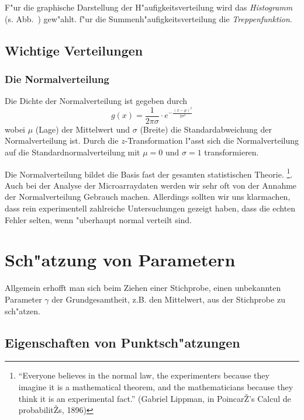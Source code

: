 F"ur die graphische Darstellung der H"aufigkeitsverteilung wird das {\em Histogramm} (s. Abb.~) gew"ahlt. f"ur die Summenh"aufigkeitsverteilung die {\em Treppenfunktion}.

%
\subsection{Wichtige Verteilungen}

\subsubsection{Die Normalverteilung}
Die Dichte der Normalverteilung ist gegeben durch
\begin{equation}\label{dichtenormal}
g(x) = \frac{1}{2\pi\sigma}\cdot e^{-\frac{(x-\mu)^2}{2\sigma^2}}
\end{equation}
wobei $\mu$ (Lage) der Mittelwert und $\sigma$ (Breite) die Standardabweichung der Normalverteilung ist. 
Durch die $z$-Transformation l"asst sich die Normalverteilung auf die Standardnormalverteilung mit $\mu=0$ und $\sigma=1$ transformieren.

Die Normalverteilung bildet die Basis fast der gesamten statistischen Theorie. \footnote{ 
``Everyone believes in the normal law, the experimenters because they imagine it is a mathematical theorem, and the mathematicians because they think it is an experimental fact.'' (Gabriel Lippman, in PoincarŽ's Calcul de probabilitŽs, 1896)}. Auch bei der Analyse der Microarraydaten werden wir sehr oft von der Annahme der Normalverteilung Gebrauch machen. Allerdings sollten wir uns klarmachen, dass  rein experimentell zahlreiche Untersuchungen gezeigt haben, dass die echten Fehler selten, wenn "uberhaupt normal verteilt sind.


\section{Sch"atzung von Parametern}
Allgemein erhofft man sich beim Ziehen einer Stichprobe, einen unbekannten Parameter $\gamma$ der Grundgesamtheit, z.B. den Mittelwert, aus der Stichprobe zu sch"atzen.
\subsection{Eigenschaften von Punktsch"atzungen}

